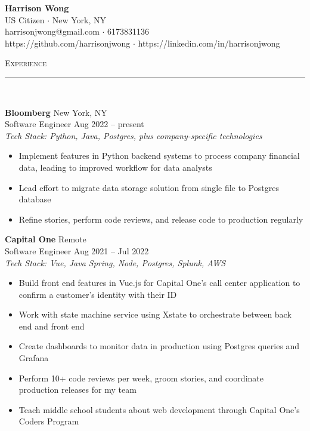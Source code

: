 \documentclass[11pt]{article}
\begin{document}
\small
\center
	\textbf{\huge Harrison Wong}  \\
	\vspace{0.05in}
	US Citizen $\cdot$ New York, NY\\
	harrisonjwong@gmail.com $\cdot$ 6173831136 \\
	https://github.com/harrisonjwong $\cdot$ https://linkedin.com/in/harrisonjwong \\
	\vspace{0.1in}
	
\begin{raggedright}
	
	
	\textsc{\Large Experience} \\
	\vspace{-0.1in}
	\rule{\textwidth}{0.4pt} \\
	\vspace{0.05in}
	
	\textbf{\large Bloomberg} \hfill New York, NY \\
	Software Engineer \hfill Aug 2022 -- present \\
	\textit{Tech Stack: Python, Java, Postgres, plus company-specific technologies} \\
	\begin{itemize}
		\item Implement features in Python backend systems to process company financial data, leading to improved workflow for data analysts
		\item Lead effort to migrate data storage solution from single file to Postgres database
		\item Refine stories, perform code reviews, and release code to production regularly 
	\end{itemize}
	\vspace{0.10in}
	
	\textbf{\large Capital One} \hfill Remote \\
	Software Engineer \hfill Aug 2021 -- Jul 2022 \\
	\textit{Tech Stack: Vue, Java Spring, Node, Postgres, Splunk, AWS} \\
	\begin{itemize}
		\item Build front end features in Vue.js for Capital One's call center application to confirm a customer's identity with their ID
		\item Work with state machine service using Xstate to orchestrate between back end and front end
		\item Create dashboards to monitor data in production using Postgres queries and Grafana
		\item Perform 10+ code reviews per week, groom stories, and coordinate production releases for my team
		\item Teach middle school students about web development through Capital One's Coders Program
	\end{itemize}
	\vspace{0.10in}
	

\end{raggedright}
\end{document}
